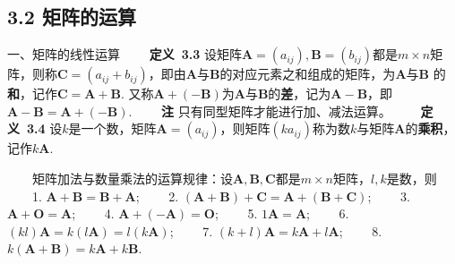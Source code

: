\documentclass[compress,mathserif,cjk]{beamer}
\theoremstyle{remark}
\numberwithin{equation}{section}
\newcommand{\hei}{\bf}      %
\begin{document}
\begin{CJK}{UTF8}{gbsn}
\section[3.2]{3.2 矩阵的运算}

\begin{frame}{一、矩阵的线性运算}
 \ \ \ \ {\hei 定义~3.3} 设矩阵$\bm A=(a_{ij}),\bm B=(b_{ij})$都是$m\times n$矩阵，则称$\bm C=(a_{ij}+b_{ij})$，即由$\bm A$与$\bm B$的对应元素之和组成的矩阵，为$\bm A$与$\bm B$ 的{\hei 和}，记作$\bm C=\bm A+\bm B$. \pause 又称$\bm A+(-\bm B)$为$\bm A$与$\bm B$的{\hei 差}，记为$\bm A-\bm B$，即$\bm A-\bm B=\bm A+(-\bm B)$.
 \vskip 5pt
 \ \ \ \ {\hei 注} 只有同型矩阵才能进行加、减法运算。
 \pause\vskip 10pt
 \ \ \ \ {\hei 定义~3.4} 设$k$是一个数，矩阵$\bm A=(a_{ij})$，则矩阵$(ka_{ij})$称为数$k$与矩阵$\bm A$的{\hei 乘积}，记作$k\bm A$.

\end{frame}

\begin{frame}
 \ \ \ \ 矩阵加法与数量乘法的运算规律：设$\bm A,\bm B,\bm C$都是$m\times n$矩阵，$l,k$是数，则
 \vskip 5pt
 \ \ \ \ 1. $\bm A+\bm B=\bm B+\bm A$;
 \vskip 5pt
 \ \ \ \ 2. $(\bm A+\bm B)+\bm C=\bm A+(\bm B+\bm C)$;
 \vskip 5pt
 \ \ \ \ 3. $\bm A+\bm O=\bm A$;
 \vskip 5pt
 \ \ \ \ 4. $\bm A+(-\bm A)=\bm O$;
 \vskip 5pt
 \ \ \ \ 5. $1\bm A=\bm A$;
 \vskip 5pt
 \ \ \ \ 6. $(kl)\bm A=k(l\bm A)=l(k\bm A)$;
 \vskip 5pt
 \ \ \ \ 7. $(k+l)\bm A=k\bm A+l\bm A$;
 \vskip 5pt
 \ \ \ \ 8. $k(\bm A+\bm B)=k\bm A+k\bm B$.

\end{frame}


\end{CJK}
\end{document}
